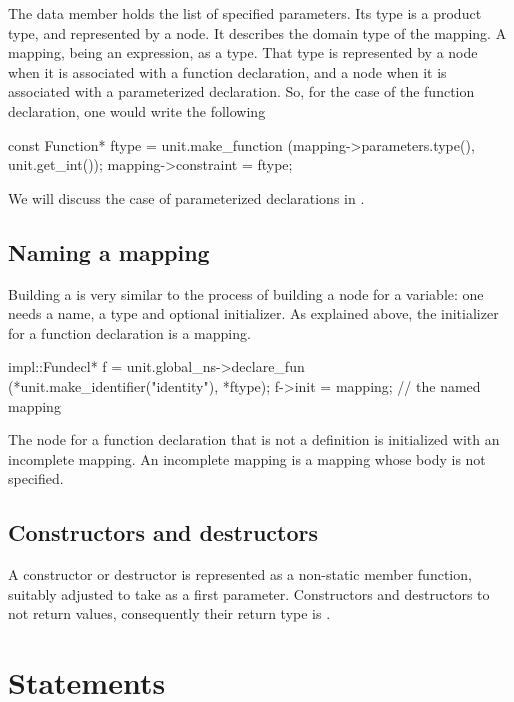 \documentclass[11pt]{article}
\begin{document}
The data member 
holds the list of specified parameters.  Its type is a product type, and
represented by a  node.  It describes the domain type of
the mapping.  A mapping, being an expression, as a type.  That type is
represented by a  node when it is associated with a
function declaration, and a  node when it is associated
with a parameterized declaration.  So, for the case of the 
function declaration, one would write the following
\begin{Program}
const Function* ftype = unit.make_function
    (mapping->parameters.type(), unit.get_int());
mapping->constraint = ftype;  
\end{Program}

We will discuss the case of parameterized declarations in
. 

\subsection{Naming a mapping}
\label{sec:fun-decl:naming}

Building a  is very similar to the process of
building a node for a variable: one needs a name, a type and optional
initializer.  As explained above, the initializer for a function declaration
is a mapping.
\begin{Program}
impl::Fundecl* f = unit.global_ns->declare_fun
   (*unit.make_identifier("identity"), *ftype);
f->init = mapping;                        // the named mapping
\end{Program}

The node for a function declaration that is not a definition is initialized
with an incomplete mapping.   An incomplete mapping is a mapping whose body is
not specified.


\subsection{Constructors and destructors}

A constructor or destructor is represented as a non-static member function,
suitably adjusted to take  as a first parameter.  Constructors and
destructors to not return values, consequently their return type is
.

\section{Statements}
\label{sec:statements}
\end{document}
